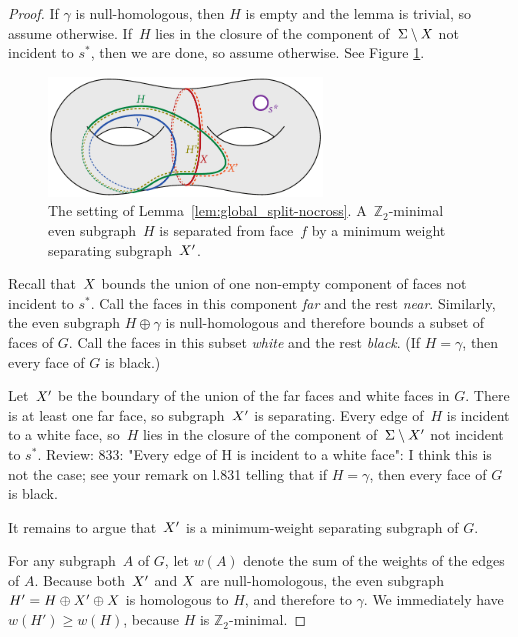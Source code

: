 \documentclass[letterpaper,review]{siamart190516}
\def\Z{\mathbb{Z}}
\def\rnote#1{\color{red}Review: #1 \color{black}}
\begin{document}
{\begin{proof}
If $\gamma$ is null-homologous, then $H$ is empty and the lemma is trivial, so assume otherwise.
If~$H$ lies in the closure of the component of~$\Sigma \setminus X$ not incident to $s^*$, then we are done, so assume otherwise.  See Figure \ref{fig:global_nonsep-vs-shortsep}. 

\begin{figure}[ht]
\centering
\includegraphics[height=1.25in]{Fig/nonsep-vs-shortsep-2}
\caption{The setting of Lemma~\ref{lem:global_split-nocross}. A~$\Z_2$-minimal even subgraph~$H$ is separated from face~$f$ by a minimum weight separating subgraph~$X'$.}
\label{fig:global_nonsep-vs-shortsep}
\end{figure}

Recall that~$X$ bounds the union of one non-empty component of faces not incident to
$s^*$.
Call the faces in this component \emph{far} and the rest \emph{near}.
Similarly, the even subgraph $H \oplus \gamma$ is null-homologous and therefore bounds a subset of
faces of $G$.
Call the faces in this subset \emph{white} and the rest \emph{black}.
(If $H = \gamma$, then every face of $G$ is black.)

Let~$X'$ be the boundary of the union of the far faces and white faces in $G$.
There is at least one far face, so subgraph~$X'$ is separating.
Every edge of~$H$ is incident to a white face, so~$H$ lies in the closure of the  component
of~$\Sigma \setminus X'$ not incident to $s^*$. \rnote{833: "Every edge of H is incident to a white face": I think this is not the case; see your remark on l.831 telling that if $H=\gamma$, then every face of $G$ is black. }

It remains to argue that~$X'$ is a minimum-weight separating subgraph of $G$.

For any subgraph~$A$ of $G$, let $w(A)$ denote the sum of the weights of the edges of $A$. Because both~$X'$ and $X$ are null-homologous, the even subgraph $H' = H \oplus X' \oplus X$ is homologous to $H$, and therefore to $\gamma$.  We immediately have $w(H') \ge w(H)$, because $H$ is $\Z_2$-minimal.


\end{proof}}
\end{document}
